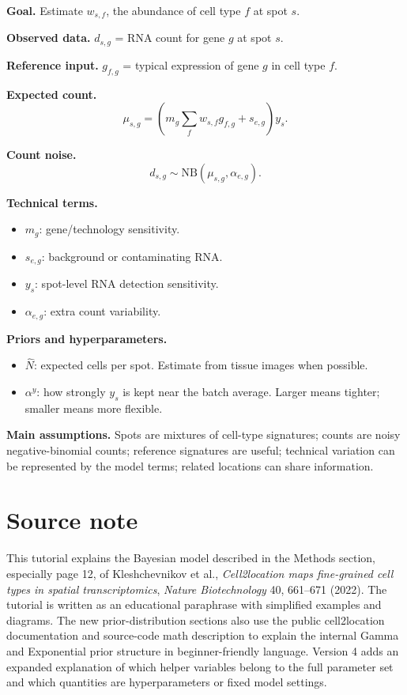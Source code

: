 \documentclass[11pt]{article}
\newcommand{\NB}{\mathrm{NB}}
\begin{document}
\begin{tcolorbox}[colback=softblue,colframe=deepblue,title=Cell2location page-12 model cheat sheet,fonttitle=\bfseries,breakable]
\textbf{Goal.} Estimate $w_{s,f}$, the abundance of cell type $f$ at spot $s$.

\textbf{Observed data.} $d_{s,g}$ = RNA count for gene $g$ at spot $s$.

\textbf{Reference input.} $g_{f,g}$ = typical expression of gene $g$ in cell type $f$.

\textbf{Expected count.}
\[
\mu_{s,g}=\left(m_g\sum_f w_{s,f}g_{f,g}+s_{e,g}\right)y_s.
\]

\textbf{Count noise.}
\[
d_{s,g}\sim \NB(\mu_{s,g},\alpha_{e,g}).
\]

\textbf{Technical terms.}
\begin{itemize}
  \item $m_g$: gene/technology sensitivity.
  \item $s_{e,g}$: background or contaminating RNA.
  \item $y_s$: spot-level RNA detection sensitivity.
  \item $\alpha_{e,g}$: extra count variability.
\end{itemize}

\textbf{Priors and hyperparameters.}
\begin{itemize}
  \item $\hat N$: expected cells per spot. Estimate from tissue images when possible.
  \item $\alpha^y$: how strongly $y_s$ is kept near the batch average. Larger means tighter; smaller means more flexible.
\end{itemize}

\textbf{Main assumptions.}
Spots are mixtures of cell-type signatures; counts are noisy negative-binomial counts; reference signatures are useful; technical variation can be represented by the model terms; related locations can share information.
\end{tcolorbox}

\section*{Source note}
This tutorial explains the Bayesian model described in the Methods section, especially page 12, of Kleshchevnikov et al., \emph{Cell2location maps fine-grained cell types in spatial transcriptomics}, \emph{Nature Biotechnology} 40, 661--671 (2022). The tutorial is written as an educational paraphrase with simplified examples and diagrams. The new prior-distribution sections also use the public cell2location documentation and source-code math description to explain the internal Gamma and Exponential prior structure in beginner-friendly language. Version 4 adds an expanded explanation of which helper variables belong to the full parameter set and which quantities are hyperparameters or fixed model settings.
\end{document}
